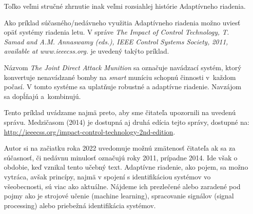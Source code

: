 \documentclass[a4paper, 10pt, ]{article}
\begin{document}
\bigskip

\noindent
Toľko veľmi stručné zhrnutie inak veľmi rozsiahlej histórie Adaptívneho riadenia.

\bigskip

\noindent
Ako príklad súčasného/nedávneho využitia Adaptívneho riadenia možno uviesť opäť systémy riadenia letu. V správe \emph{The Impact of Control Technology, T. Samad and A.M. Annaswamy (eds.), IEEE Control Systems Society, 2011, available at www.ieeecss.org.} je uvedený takýto príklad.

Názvom \emph{The Joint Direct Attack Munition} sa označuje navádzací systém, ktorý konvertuje nenavádzané bomby na \emph{smart} muníciu schopnú činnosti v~každom počasí. V tomto systéme sa uplatňuje robustné a adaptívne riadenie. Navzájom sa dopĺňajú a~kombinujú.

Tento príklad uvádzame najmä preto, aby sme čitateľa upozornili na uvedenú správu. Medzičasom (2014) je dostupná aj druhá edícia tejto správy, dostupné na: \url{http://ieeecss.org/impact-control-technology-2nd-edition}.












\begin{figure}[!t]
	\centering
	\label{Základá schéma adaptívneho riadenia a schéma Gain Scheduling}
\end{figure}








\bigskip

\noindent
Autor si na začiatku roka 2022 uvedomuje možnú zmätenosť čitateľa ak sa za súčasnosť, či nedávnu minulosť označujú roky 2011, prípadne 2014. Ide však o obdobie, keď vznikal tento učebný text. Adaptívne riadenie, ako pojem, sa možno vytráca, avšak princípy, najmä v spojení s identifikáciou systémov vo všeobecnosti, sú viac ako aktuálne. Nájdeme ich prezlečené alebo zaradené pod pojmy ako je strojové učenie (machine learning), spracovanie signálov (signal processing) alebo priebežná identifikácia systémov.
\end{document}
